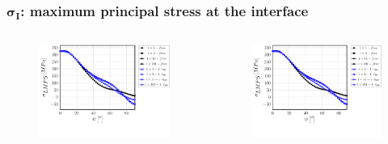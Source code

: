 \documentclass[first,firstsupp,lastsupp,last,hyperref,table]{ETHclass}
\begin{document}
\begin{frame}
\frametitle{\vspace{0.2cm}\small $\mathbf{\sigma_{I}}$: maximum principal stress at the interface}
\vspace{-.75cm}
\centering
\begin{columns}[c]
\centering
\begin{column}{0.5\textwidth}
\centering
\begin{figure}
\centering
\includegraphics[width=\columnwidth]{vf60-nodamage-sigmaI2D-notol.pdf}
\end{figure}
\end{column}
\begin{column}{0.5\textwidth}
\centering
\begin{figure}
\centering
\includegraphics[width=\columnwidth]{vf60-nodamage-sigmaI3D-notol.pdf}

\end{figure}
\end{column}
\end{columns}
\end{frame}
\end{document}
